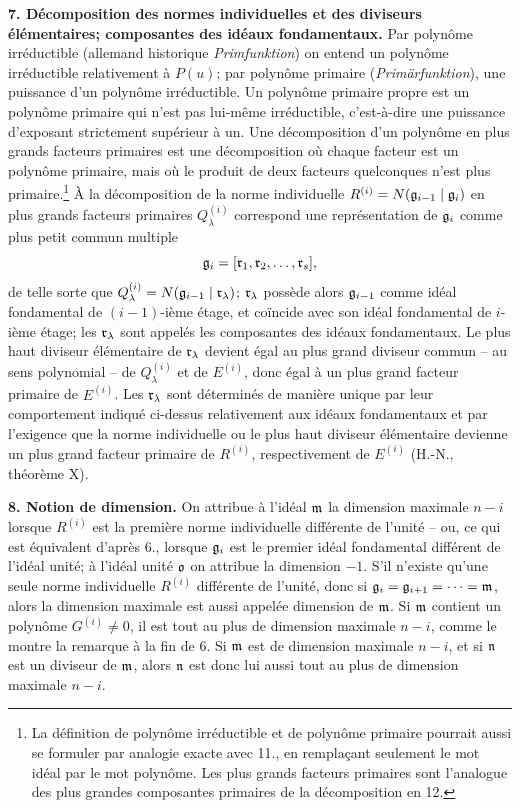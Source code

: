 \textbf{7. Décomposition des normes individuelles et des diviseurs élémentaires; composantes des idéaux fondamentaux.} Par polynôme irréductible (allemand historique \emph{Primfunktion}) on entend un polynôme irréductible relativement à $P(u)$; par polynôme primaire (\emph{Primärfunktion}), une puissance d'un polynôme irréductible. Un polynôme primaire propre est un polynôme primaire qui n'est pas lui-même irréductible, c'est-à-dire une puissance d'exposant strictement supérieur à un. Une décomposition d'un polynôme en plus grands facteurs primaires est une décomposition où chaque facteur est un polynôme primaire, mais où le produit de deux facteurs quelconques n'est plus primaire.\footnote{La définition de polynôme irréductible et de polynôme primaire pourrait aussi se formuler par analogie exacte avec 11., en remplaçant seulement le mot idéal par le mot polynôme. Les plus grands facteurs primaires sont l'analogue des plus grandes composantes primaires de la décomposition en 12.} À la décomposition de la norme individuelle $R^{(i)}=N(\mathfrak g_{i-1}\mid\mathfrak g_i)$ en plus grands facteurs primaires $Q_\lambda^{(i)}$ correspond une représentation de $\mathfrak g_i$ comme plus petit commun multiple
\[
 \mathfrak g_i=[\mathfrak r_1,\mathfrak r_2,\ldots,\mathfrak r_s],
\]
de telle sorte que $Q_\lambda^{(i)}=N(\mathfrak g_{i-1}\mid\mathfrak r_\lambda)$; $\mathfrak r_\lambda$ possède alors $\mathfrak g_{i-1}$ comme idéal fondamental de $(i-1)$-ième étage, et coïncide avec son idéal fondamental de $i$-ième étage; les $\mathfrak r_\lambda$ sont appelés les composantes des idéaux fondamentaux. Le plus haut diviseur élémentaire de $\mathfrak r_\lambda$ devient égal au plus grand diviseur commun -- au sens polynomial -- de $Q_\lambda^{(i)}$ et de $E^{(i)}$, donc égal à un plus grand facteur primaire de $E^{(i)}$. Les $\mathfrak r_\lambda$ sont déterminés de manière unique par leur comportement indiqué ci-dessus relativement aux idéaux fondamentaux et par l'exigence que la norme individuelle ou le plus haut diviseur élémentaire devienne un plus grand facteur primaire de $R^{(i)}$, respectivement de $E^{(i)}$ (H.-N., théorème X).

\textbf{8. Notion de dimension.} On attribue à l'idéal $\mathfrak m$ la dimension maximale $n-i$ lorsque $R^{(i)}$ est la première norme individuelle différente de l'unité -- ou, ce qui est équivalent d'après 6., lorsque $\mathfrak g_i$ est le premier idéal fondamental différent de l'idéal unité; à l'idéal unité $\mathfrak o$ on attribue la dimension $-1$. S'il n'existe qu'une seule norme individuelle $R^{(i)}$ différente de l'unité, donc si $\mathfrak g_i=\mathfrak g_{i+1}=\cdots=\mathfrak m$, alors la dimension maximale est aussi appelée dimension de $\mathfrak m$. Si $\mathfrak m$ contient un polynôme $G^{(i)}\ne0$, il est tout au plus de dimension maximale $n-i$, comme le montre la remarque à la fin de 6. Si $\mathfrak m$ est de dimension maximale $n-i$, et si $\mathfrak n$ est un diviseur de $\mathfrak m$, alors $\mathfrak n$ est donc lui aussi tout au plus de dimension maximale $n-i$.

